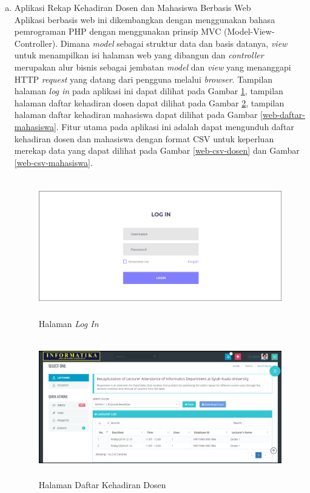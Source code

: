 \begin{enumerate}[a.]
\begin{enumerate}[a.]
	\item Aplikasi Rekap Kehadiran Dosen dan Mahasiswa Berbasis Web
	      \\
	      Aplikasi berbasis web ini dikembangkan dengan menggunakan bahasa pemrograman PHP dengan menggunakan prinsip MVC (Model-View-Controller). Dimana \textit{model} sebagai struktur data dan basis datanya, \textit{view} untuk menampilkan isi halaman web yang dibangun dan \textit{controller} merupakan alur bisnis sebagai jembatan \textit{model} dan \textit{view} yang menanggapi HTTP \textit{request} yang datang dari pengguna melalui \textit{browser}. Tampilan halaman \textit{log in} pada aplikasi ini dapat dilihat pada Gambar \ref{web-login}, tampilan halaman daftar kehadiran dosen dapat dilihat pada Gambar \ref{web-daftar-dosen}, tampilan halaman daftar kehadiran mahasiswa dapat dilihat pada Gambar \ref{web-daftar-mahasiswa}. Fitur utama pada aplikasi ini adalah dapat mengunduh daftar kehadiran dosen dan mahasiswa dengan format CSV untuk keperluan merekap data yang dapat dilihat pada Gambar \ref{web-csv-dosen} dan Gambar \ref{web-csv-mahasiswa}.
	      \vspace{-0.2cm}
	      \begin{figure}[H]
		      \center
		      \includegraphics [width = 13cm, height= 6cm]{gambar/web/login}
		      \caption{Halaman \textit{Log In}}
		      \label{web-login}
	      \end{figure}

	      \vspace{-0.2cm}
	      \begin{figure}[H]
		      \center
		      \includegraphics [width = 13cm, height= 6cm]{gambar/web/dashboard-dosen}
		      \caption{Halaman Daftar Kehadiran Dosen}
		      \label{web-daftar-dosen}
	      \end{figure}


\end{enumerate}
\end{enumerate}
